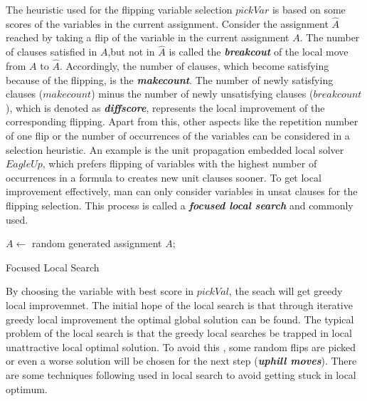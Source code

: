 \documentclass[12pt,a4paper,twoside]{scrartcl}
\numberwithin{equation}{section}
\begin{document}
The heuristic used for the flipping variable selection $pickVar$  is based on some scores of the variables in the current assignment. Consider the assignment $\hat{A}$  reached by taking a flip of the variable in the current assignment $A$. The number of clauses satisfied in $A$,but not in $\hat{A}$ is called the \emph{\textbf{breakcout}} of the local move from $A$ to $\hat{A}$. Accordingly, the number of clauses, which become satisfying because of the flipping, is the  \emph{\textbf{makecount}}. The number of newly satisfying clauses ($makecount$) minus the number of newly unsatisfying clauses ($breakcount$), which is denoted as \emph{\textbf{diffscore}}, represents the local improvement of the corresponding flipping. Apart from this, other aspects like the repetition number of one flip or the number of occurrences of the variables can be considered in a selection heuristic. An example is the unit propagation embedded local solver $EagleUp$, which prefers flipping of variables with the highest number of occurrences in a formula to creates new unit clauses sooner. To get local improvement effectively, man can only consider variables in unsat clauses for the flipping selection. This process is called a \emph{\textbf{focused local search}} and commonly used. \\
\begin{algorithm}[H]
  $A \leftarrow$ random generated assignment  $A$;\;
 \caption{Focused Local Search}
\end{algorithm}  

By choosing the variable with best score in $pickVal$, the seach will get greedy local improvemnet. 
The initial hope of the local search is that through iterative greedy local improvement the optimal global solution can be found. The typical problem of the local search is that the greedy local searches be trapped in local unattractive local optimal solution.  To avoid this , some random flips are picked or even a worse solution  will be chosen for the next step (\emph{\textbf{uphill moves}}). There are some techniques following used in local search to avoid getting stuck in local optimum.
\end{document}
